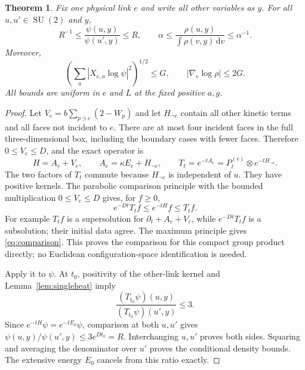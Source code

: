\documentclass[11pt]{article}
\newtheorem{theorem}{Theorem}[section]
\newcommand{\SU}{\operatorname{SU}}
\newcommand{\dd}{\,\mathrm d}
\begin{document}
\begin{theorem}\label{thm:localvacuum}
Fix one physical link $e$ and write all other variables as $y$. For all
$u,u'\in\SU(2)$ and $y$,
\begin{equation}\label{eq:ratio}
 R^{-1}\leq\frac{\psi(u,y)}{\psi(u',y)}\leq R,\qquad
 \alpha\leq\frac{\rho(u,y)}{\int\rho(v,y)\dd v}\leq\alpha^{-1}.
\end{equation}
Moreover,
\begin{equation}\label{eq:scorebound}
 \left(\sum_a|X_{e,a}\log\psi|^2\right)^{1/2}\leq G,
 \qquad |\nabla_e\log\rho|\leq2G.
\end{equation}
All bounds are uniform in $e$ and $L$ at the fixed positive $a,g$.
\end{theorem}
\begin{proof}
Let $V_e=b\sum_{p\ni e}(2-W_p)$ and let $H_{\neg e}$ contain all
other kinetic terms and all faces not incident to $e$. There are at
most four incident faces in the full three-dimensional box, including
the boundary cases with fewer faces. Therefore $0\leq V_e\leq D$,
and the exact operator is
\[
 H=A_e+V_e,\qquad A_e=\kappa E_e+H_{\neg e},\qquad
 T_t=e^{-tA_e}=P_t^{(e)}\otimes e^{-tH_{\neg e}}.
\]
The two factors of $T_t$ commute because $H_{\neg e}$ is independent
of $u$. They have positive kernels. The parabolic comparison principle
with the bounded multiplication $0\leq V_e\leq D$ gives, for $f\geq0$,
\begin{equation}\label{eq:comparison}
 e^{-Dt}T_tf\leq e^{-tH}f\leq T_tf.
\end{equation}
For example $T_tf$ is a supersolution for
$\partial_t+A_e+V_e$, while $e^{-Dt}T_tf$ is a subsolution; their
initial data agree. The maximum principle gives \eqref{eq:comparison}.
This proves the comparison for this compact group product directly;
no Euclidean configuration-space identification is needed.

Apply it to $\psi$. At $t_0$, positivity of the other-link kernel and
Lemma~\ref{lem:singleheat} imply
\[
 \frac{(T_{t_0}\psi)(u,y)}{(T_{t_0}\psi)(u',y)}\leq3.
\]
Since $e^{-tH}\psi=e^{-tE_0}\psi$, comparison at both $u,u'$ gives
$\psi(u,y)/\psi(u',y)\leq3e^{Dt_0}=R$.
Interchanging $u,u'$ proves both sides. Squaring and averaging the
denominator over $u'$ proves the conditional density bounds.
The extensive energy $E_0$ cancels from this ratio exactly.


\end{proof}
\end{document}
